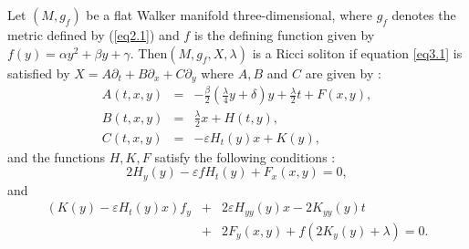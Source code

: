 \documentclass[10pt,a4paper]{amsart}
\begin{document}
 \begin{corollary}
Let $(M, g_f)$ be a flat Walker manifold three-dimensional, where $g_f$ 
denotes the metric defined by (\ref{eq2.1}) and $f$ is the defining function 
given by $f(y)=\alpha y^{2}+\beta y+\gamma$. Then$(M, g_f, X, \lambda)$ 
is a Ricci soliton  if equation \eqref{eq3.1} is satisfied by 
$X = A\partial_t+ B\partial_x + C \partial_y $ where $A, B $ and $C$ are given by :
\begin{eqnarray}\label{eq3.8}
A(t,x, y) &=& - \frac{\beta}{2} \left( \frac{\lambda}{4}y+ \delta\right)y  
		+ \frac{\lambda }{2} t +F(x,y), \nonumber\\ 
B(t,x,y) &=&\frac{\lambda}{2}x+H(t,y),\nonumber  \\ 
C(t,x,y) &=& -\varepsilon H_{t}(y)x+K(y),
\end{eqnarray}
and the functions $H,K,F$ satisfy the following conditions :
\begin{equation*}
2H_y(y) - \varepsilon fH_t(y) + F_x(x,y)=0,
\end{equation*}
and
\begin{eqnarray*}
\left(K(y) - \varepsilon H_{t}(y)x\right)f_y &+& 2\varepsilon H_{yy}(y)x - 2K_{yy}(y)t \\
	&+& 2F_{y}(x,y) + f\left( 2K_{y}(y) + \lambda\right) =0. 
\end{eqnarray*}
\end{corollary}
\end{document}

